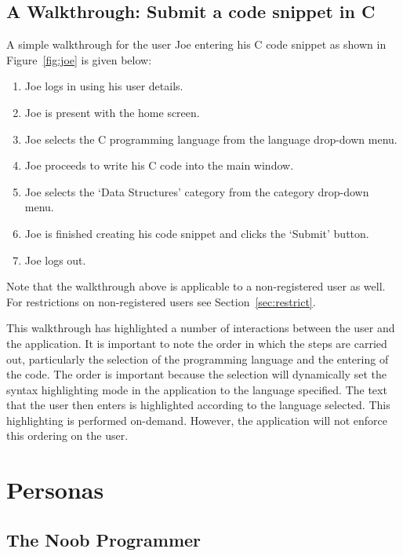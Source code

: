 \documentclass[11pt,a4paper]{article}
\begin{document}
\subsection{A Walkthrough: Submit a code snippet in C}

A simple walkthrough for the user Joe entering his C code snippet as
shown in Figure~\ref{fig:joe} is given below:

\begin{enumerate}
\item Joe logs in using his user details.
\item Joe is present with the home screen.
\item Joe selects the C programming language from the language drop-down
menu.
\item Joe proceeds to write his C code into the main window.
\item Joe selects the `Data Structures' category from the category
drop-down menu.
\item Joe is finished creating his code snippet and clicks the `Submit'
button.
\item Joe logs out.
\end{enumerate}

Note that the walkthrough above is applicable to a non-registered user
as well. For restrictions on non-registered users see
Section~\ref{sec:restrict}.

This walkthrough has highlighted a number of interactions between the
user and the application. It is important to note the order in which
the steps are carried out, particularly the selection of the
programming language and the entering of the code. The order is
important because the selection will dynamically set the syntax
highlighting mode in the application to the language specified.
The text that the user then enters is highlighted according to the
language selected. This highlighting is performed on-demand. %
However, the application will not enforce this ordering on the user.

\newpage

\section{Personas}

\subsection{The Noob Programmer}
\end{document}
